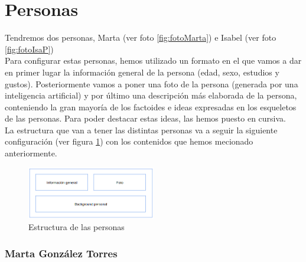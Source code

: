 
\section{Personas}

Tendremos dos personas, Marta (ver foto \ref{fig:fotoMarta}) e Isabel (ver foto \ref{fig:fotoIsaP}) \\

Para configurar estas personas, hemos utilizado un formato en el que vamos a dar en primer lugar la información general de la persona 
(edad, sexo, estudios y gustos). Posteriormente vamos a poner una foto de la persona (generada por una inteligencia artificial) y por último 
una descripción más elaborada de la persona, conteniendo la gran mayoría de los factoides e ideas expresadas en los esqueletos de las personas. 
Para poder destacar estas ideas, las hemos puesto en cursiva. \\

La estructura que van a tener las distintas personas va a seguir la siguiente configuración (ver figura \ref{fig:estructura-personas}) con los contenidos que hemos mecionado anteriormente.
\begin{figure}[h]
    \centering
    \includegraphics[width=0.5\textwidth]{Imagenes/Personas/Plantilla personas.png}
    \caption{Estructura de las personas}
    \label{fig:estructura-personas}
\end{figure}

\subsubsection{Marta González Torres}

